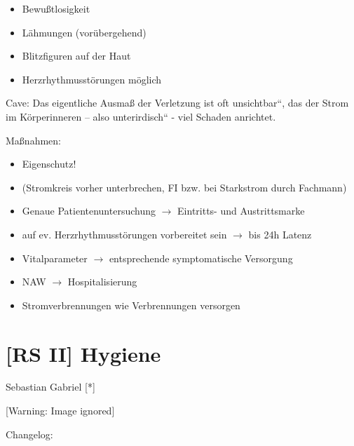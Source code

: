 \documentclass{article}
\begin{document}
\begin{itemize}
\item Bewu{\ss}tlosigkeit

\item L\"ahmungen (vor\"ubergehend)

\item Blitzfiguren auf der Haut

\item Herzrhythmusst\"orungen m\"oglich

\end{itemize}
Cave: Das eigentliche Ausma{\ss} der Verletzung ist oft
{\quotedblbase}unsichtbar{\textquotedblleft}, das der Strom im
K\"orperinneren -- also {\quotedblbase}unterirdisch{\textquotedblleft}
- viel Schaden anrichtet. 

Ma{\ss}nahmen:

\begin{itemize}
\item Eigenschutz! 

\end{itemize}
\begin{itemize}
\item (Stromkreis  vorher  unterbrechen, FI bzw. bei Starkstrom durch 
Fachmann)

\end{itemize}
\begin{itemize}
\item Genaue  Patientenuntersuchung ${\rightarrow}$ Eintritts{}-  und
Austrittsmarke

\item auf ev. Herzrhythmusst\"orungen vorbereitet  sein ${\rightarrow}$
bis 24h Latenz

\item Vitalparameter ${\rightarrow}$ entsprechende  symptomatische
Versorgung

\item NAW ${\rightarrow}$ Hospitalisierung

\item Stromverbrennungen wie Verbrennungen  versorgen

\end{itemize}
\section[[RS II{]} Hygiene ]{[RS II] Hygiene }
\label{bkm:RefHeading32633609}Sebastian Gabriel [*]

\begin{center}
 [Warning: Image ignored] %

\end{center}
Changelog:
\end{document}
